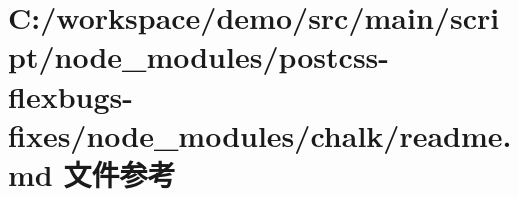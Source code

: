 \hypertarget{node__modules_2postcss-flexbugs-fixes_2node__modules_2chalk_2_r_e_a_d_m_e_8md}{}\section{C\+:/workspace/demo/src/main/script/node\+\_\+modules/postcss-\/flexbugs-\/fixes/node\+\_\+modules/chalk/readme.md 文件参考}
\label{node__modules_2postcss-flexbugs-fixes_2node__modules_2chalk_2_r_e_a_d_m_e_8md}
